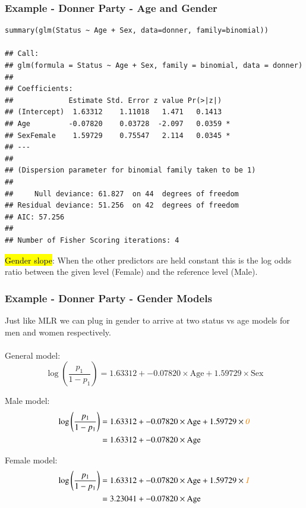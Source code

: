 
\begin{frame}[fragile]
\frametitle{Example - Donner Party - Age and Gender}
\vspace{-3mm}
{\scriptsize
\begin{verbatim}
summary(glm(Status ~ Age + Sex, data=donner, family=binomial))

## Call:
## glm(formula = Status ~ Age + Sex, family = binomial, data = donner)
## 
## Coefficients:
##             Estimate Std. Error z value Pr(>|z|)  
## (Intercept)  1.63312    1.11018   1.471   0.1413  
## Age         -0.07820    0.03728  -2.097   0.0359 *
## SexFemale    1.59729    0.75547   2.114   0.0345 *
## ---
## 
## (Dispersion parameter for binomial family taken to be 1)
## 
##     Null deviance: 61.827  on 44  degrees of freedom
## Residual deviance: 51.256  on 42  degrees of freedom
## AIC: 57.256
## 
## Number of Fisher Scoring iterations: 4
\end{verbatim}
}

\hl{Gender slope}: When the other predictors are held constant this is the log odds ratio between the given level (Female) and the reference level (Male).

\end{frame}


\begin{frame}
\frametitle{Example - Donner Party - Gender Models}

Just like MLR we can plug in gender to arrive at two status vs age models for men and women respectively.\\
~\\

General model:
{\scriptsize
\[\log\left(\frac{p_1}{1-p_1}\right) = 1.63312 + -0.07820\times\text{Age} + 1.59729\times\text{Sex}\]
}

Male model:
{\scriptsize
\begin{align*}
\log\left(\frac{p_1}{1-p_1}\right) &= 1.63312 + -0.07820\times\text{Age} + 1.59729\times\textit{\textcolor{orange}{0}}\\
                                   &= 1.63312 + -0.07820\times\text{Age}
\end{align*}
}

Female model:
{\scriptsize
\begin{align*}
\log\left(\frac{p_1}{1-p_1}\right) &= 1.63312 + -0.07820\times\text{Age} + 1.59729\times\textit{\textcolor{orange}{1}}\\
                                   &= 3.23041 + -0.07820\times\text{Age}
\end{align*}
}

\end{frame}

